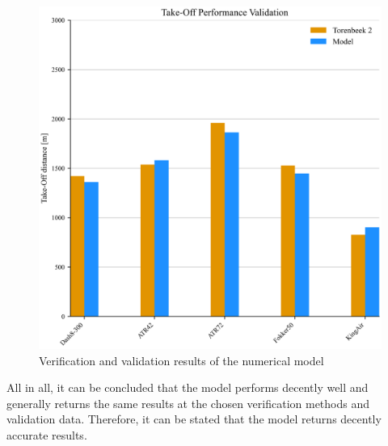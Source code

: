 \begin{figure}[!ht]
    \centering
    \includegraphics[width=0.5\linewidth]{figures/VALIDATION_OEI.png}
    \caption{Verification and validation results of the numerical model}
    \label{fig:verification_OEI}
\end{figure}

All in all, it can be concluded that the model performs decently well and generally returns the same results at the chosen verification methods and validation data. Therefore, it can be stated that the model returns decently accurate results.